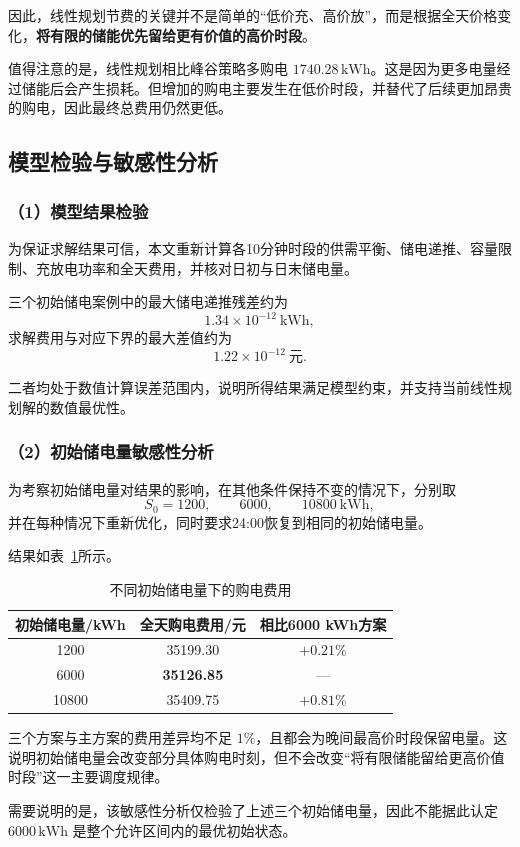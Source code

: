 因此，线性规划节费的关键并不是简单的“低价充、高价放”，而是根据全天价格变化，\textbf{将有限的储能优先留给更有价值的高价时段}。

值得注意的是，线性规划相比峰谷策略多购电 \(1740.28\,\mathrm{kWh}\)。这是因为更多电量经过储能后会产生损耗。但增加的购电主要发生在低价时段，并替代了后续更加昂贵的购电，因此最终总费用仍然更低。

\subsection{模型检验与敏感性分析}

\subsubsection*{（1）模型结果检验}

为保证求解结果可信，本文重新计算各10分钟时段的供需平衡、储电递推、容量限制、充放电功率和全天费用，并核对日初与日末储电量。

三个初始储电案例中的最大储电递推残差约为
\[
1.34\times10^{-12}\ \mathrm{kWh},
\]
求解费用与对应下界的最大差值约为
\[
1.22\times10^{-12}\ \text{元}.
\]

二者均处于数值计算误差范围内，说明所得结果满足模型约束，并支持当前线性规划解的数值最优性。

\subsubsection*{（2）初始储电量敏感性分析}

为考察初始储电量对结果的影响，在其他条件保持不变的情况下，分别取
\[
S_0=1200,\qquad 6000,\qquad 10800\ \mathrm{kWh},
\]
并在每种情况下重新优化，同时要求24:00恢复到相同的初始储电量。

结果如表~\ref{tab:q1_sensitivity}所示。

\begin{table}[H]
    \centering
    \caption{不同初始储电量下的购电费用}
    \label{tab:q1_sensitivity}
    \begin{tabular}{ccc}
        \toprule
        初始储电量/kWh & 全天购电费用/元 & 相比6000 kWh方案 \\
        \midrule
        1200 & 35199.30 & $+0.21\%$ \\
        6000 & \textbf{35126.85} & --- \\
        10800 & 35409.75 & $+0.81\%$ \\
        \bottomrule
    \end{tabular}
\end{table}

三个方案与主方案的费用差异均不足 \(1\%\)，且都会为晚间最高价时段保留电量。这说明初始储电量会改变部分具体购电时刻，但不会改变“将有限储能留给更高价值时段”这一主要调度规律。

需要说明的是，该敏感性分析仅检验了上述三个初始储电量，因此不能据此认定 \(6000\,\mathrm{kWh}\) 是整个允许区间内的最优初始状态。
